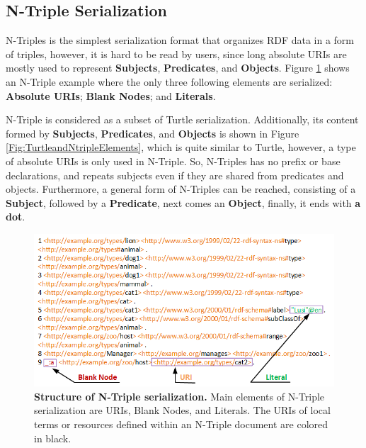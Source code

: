 \subsection{N-Triple Serialization}
N-Triples \cite{W3C:Ntriples:Online} is the simplest serialization format that organizes RDF data in a form of triples, however, it is hard to be read by users, since long absolute URIs are mostly used to represent \textbf{Subjects}, \textbf{Predicates}, and \textbf{Objects}. 
Figure \ref{Fig:NTriplesStructure} shows an N-Triple example where the only three following elements are serialized: \textbf{Absolute URIs}; \textbf{Blank Nodes}; and \textbf{Literals}. 

N-Triple is considered as a subset of Turtle serialization. 
Additionally, its content formed by \textbf{Subjects}, \textbf{Predicates}, and \textbf{Objects} is shown in Figure \ref{Fig:TurtleandNtripleElements}, which is quite similar to Turtle, however, a type of absolute URIs is only used in N-Triple. 
So, N-Triples has no prefix or base declarations, and repeats subjects even if they are shared from predicates and objects. Furthermore, a general form of N-Triples can be reached,  consisting of a \textbf{Subject}, followed by a \textbf{Predicate}, next comes an \textbf{Object}, finally, it ends with \textbf{a dot}.   

\begin{figure}[ht]
	\begin{center}
		\includegraphics[scale=0.8,angle=0]{images/NTriplesStructure.png}
		\setlength\belowcaptionskip{-5mm}
		\caption{\textbf{Structure of N-Triple serialization.} 
		Main elements of N-Triple serialization are URIs, Blank Nodes, and Literals. 
		The URIs of local terms or resources defined within an N-Triple document are colored in black.}
		\label{Fig:NTriplesStructure}
	\end{center}
\end{figure}


